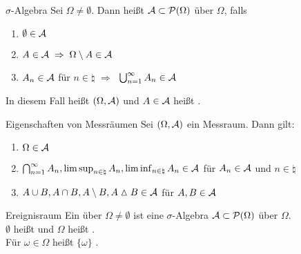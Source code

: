 \begin{Def}{$\sigma$-Algebra}
    Sei $\Omega \not= \emptyset$.
    Dann heißt $\mathcal{A} \subset \mathcal{P}(\Omega)$  über $\Omega$, falls
    \begin{enumerate}
        \item
        $\emptyset \in \mathcal{A}$

        \item
        $A \in \mathcal{A} \;\Rightarrow\; \Omega \setminus A \in \mathcal{A}$

        \item
        $A_n \in \mathcal{A}$ für $n \in \natural$ $\Rightarrow\;$ $\bigcup_{n=1}^\infty A_n \in \mathcal{A}$
    \end{enumerate}
    In diesem Fall heißt $(\Omega, \mathcal{A})$  und $A \in \mathcal{A}$ heißt .
\end{Def}

\begin{Satz}{Eigenschaften von Messräumen}
    Sei $(\Omega, \mathcal{A})$ ein Messraum.
    Dann gilt:
    \begin{enumerate}
        \item
        $\Omega \in \mathcal{A}$

        \item
        $\bigcap_{n=1}^\infty A_n, \limsup_{n \in \natural} A_n,
        \liminf_{n \in \natural} A_n \in \mathcal{A}$
        für $A_n \in \mathcal{A}$ und $n \in \natural$

        \item
        $A \cup B, A \cap B, A \setminus B, A \vartriangle B \in \mathcal{A}$ für $A, B \in \mathcal{A}$
    \end{enumerate}
\end{Satz}

\linie
\pagebreak

\begin{Def}{Ereignisraum}
    Ein  über $\Omega \not= \emptyset$ ist eine $\sigma$-Algebra
    $\mathcal{A} \subset \mathcal{P}(\Omega)$ über $\Omega$.\\
    $\emptyset$ heißt  und
    $\Omega$ heißt .\\
    Für $\omega \in \Omega$ heißt $\{\omega\}$ .
\end{Def}

